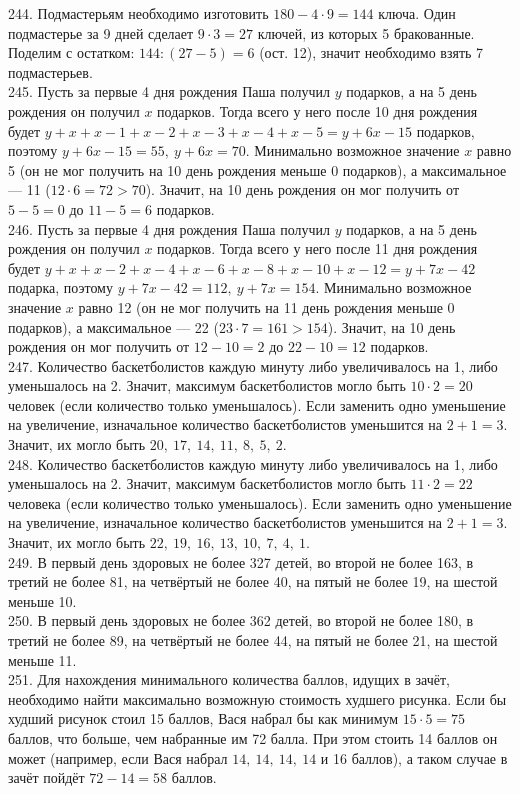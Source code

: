 \documentclass[12pt]{article}
\begin{document}
244. Подмастерьям необходимо изготовить $180-4\cdot9=144$ ключа. Один подмастерье за 9 дней сделает $9\cdot3=27$ ключей, из которых 5 бракованные. Поделим с остатком: $144:(27-5)=6$ (ост. 12), значит необходимо взять 7 подмастерьев.\\
245. Пусть за первые 4 дня рождения Паша получил $y$ подарков, а на 5 день рождения он получил $x$ подарков. Тогда всего у него после 10 дня рождения будет $y+x+x-1+x-2+x-3+x-4+x-5=y+6x-15$ подарков, поэтому $y+6x-15=55,\ y+6x=70.$ Минимально возможное значение $x$ равно 5 (он не мог получить на 10 день рождения меньше 0 подарков), а максимальное --- 11 ($12\cdot6=72>70$). Значит, на 10 день рождения он мог получить от $5-5=0$ до $11-5=6$ подарков.\\
246. Пусть за первые 4 дня рождения Паша получил $y$ подарков, а на 5 день рождения он получил $x$ подарков. Тогда всего у него после 11 дня рождения будет $y+x+x-2+x-4+x-6+x-8+x-10+x-12=y+7x-42$ подарка, поэтому $y+7x-42=112,\ y+7x=154.$ Минимально возможное значение $x$ равно 12 (он не мог получить на 11 день рождения меньше 0 подарков), а максимальное --- 22 ($23\cdot7=161>154$). Значит, на 10 день рождения он мог получить от $12-10=2$ до $22-10=12$ подарков.\\
247. Количество баскетболистов каждую минуту либо увеличивалось на 1, либо уменьшалось на 2. Значит, максимум баскетболистов могло быть $10\cdot2=20$ человек (если количество только уменьшалось). Если заменить одно уменьшение на увеличение, изначальное количество баскетболистов уменьшится на $2+1=3.$ Значит, их могло быть $20,\ 17,\ 14,\ 11,\ 8,\ 5,\ 2.$\\
248. Количество баскетболистов каждую минуту либо увеличивалось на 1, либо уменьшалось на 2. Значит, максимум баскетболистов могло быть $11\cdot2=22$ человека (если количество только уменьшалось). Если заменить одно уменьшение на увеличение, изначальное количество баскетболистов уменьшится на $2+1=3.$ Значит, их могло быть $22,\ 19,\ 16,\ 13,\ 10,\ 7,\ 4,\ 1.$\\
249. В первый день здоровых не более 327 детей, во второй не более 163, в третий не более 81, на четвёртый не более 40, на пятый не более 19, на шестой меньше 10.\\
250. В первый день здоровых не более 362 детей, во второй не более 180, в третий не более 89, на четвёртый не более 44, на пятый не более 21, на шестой меньше 11.\\
251. Для нахождения минимального количества баллов, идущих в зачёт, необходимо найти максимально возможную стоимость худшего рисунка. Если бы худший рисунок стоил 15 баллов, Вася набрал бы как минимум $15\cdot5=75$ баллов, что больше, чем набранные им 72 балла. При этом стоить 14 баллов он может (например, если Вася набрал $14,\ 14,\ 14,\ 14$ и 16 баллов), а таком случае в зачёт пойдёт $72-14=58$ баллов.\\
\end{document}
